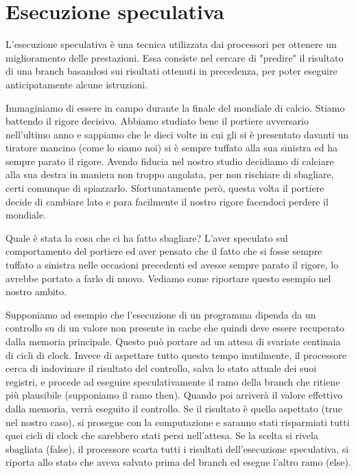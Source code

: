 	\section{Esecuzione speculativa}
		L'esecuzione speculativa è una tecnica utilizzata dai processori per ottenere un miglioramento delle prestazioni. Essa consiste nel cercare di "predire" il risultato di una branch basandosi sui risultati ottenuti in precedenza, per poter eseguire anticipatamente alcune istruzioni.
		
		Immaginiamo di essere in campo durante la finale del mondiale di calcio. Stiamo battendo il rigore decisivo. Abbiamo studiato bene il portiere avversario nell'ultimo anno e sappiamo che le dieci volte in cui gli si è presentato davanti un tiratore mancino (come lo siamo noi) si è sempre tuffato alla sua sinistra ed ha sempre parato il rigore. Avendo fiducia nel nostro studio decidiamo di calciare alla sua destra in maniera non troppo angolata, per non rischiare di sbagliare, certi comunque di spiazzarlo. Sfortunatamente però, questa volta il portiere decide di cambiare lato e para facilmente il nostro rigore facendoci perdere il mondiale.
		
		Quale è stata la cosa che ci ha fatto sbagliare? L'aver speculato sul comportamento del portiere ed aver pensato che il fatto che si fosse sempre tuffato a sinistra nelle occasioni precedenti ed avesse sempre parato il rigore, lo avrebbe portato a farlo di nuovo. Vediamo come riportare questo esempio nel nostro ambito. 
		
		Supponiamo ad esempio che l'esecuzione di un programma dipenda da un controllo su di un valore non presente in cache che quindi deve essere recuperato dalla memoria principale. Questo può portare ad un attesa di svariate centinaia di cicli di clock. Invece di aspettare tutto questo tempo inutilmente, il processore cerca di indovinare il risultato del controllo, salva lo stato attuale dei suoi registri, e procede ad eseguire speculativamente il ramo della branch che ritiene più plausibile (supponiamo il ramo then). Quando poi arriverà il valore effettivo dalla memoria, verrà eseguito il controllo. Se il risultato è quello aspettato (true nel nostro caso), si prosegue con la computazione e saranno stati risparmiati tutti quei cicli di clock che sarebbero stati persi nell'attesa. Se la scelta si rivela sbagliata (false), il processore scarta tutti i risultati dell'esecuzione speculativa, si riporta allo stato che aveva salvato prima del branch ed esegue l'altro ramo (else).
		
